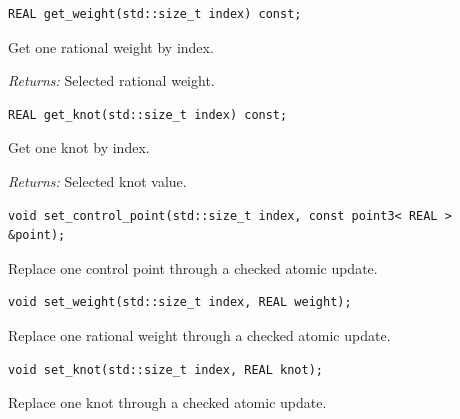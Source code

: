\par\noindent\begin{minipage}{\linewidth}
\begin{lstlisting}[style=apireference]
REAL get_weight(std::size_t index) const;
\end{lstlisting}
{\footnotesize Get one rational weight by index.\par}
{\footnotesize\textit{Returns:} Selected rational weight.\par}
\end{minipage}\par\vspace{1pt}
\par\noindent\begin{minipage}{\linewidth}
\begin{lstlisting}[style=apireference]
REAL get_knot(std::size_t index) const;
\end{lstlisting}
{\footnotesize Get one knot by index.\par}
{\footnotesize\textit{Returns:} Selected knot value.\par}
\end{minipage}\par\vspace{1pt}
\par\noindent\begin{minipage}{\linewidth}
\begin{lstlisting}[style=apireference]
void set_control_point(std::size_t index, const point3< REAL > &point);
\end{lstlisting}
{\footnotesize Replace one control point through a checked atomic update.\par}
\end{minipage}\par\vspace{1pt}
\par\noindent\begin{minipage}{\linewidth}
\begin{lstlisting}[style=apireference]
void set_weight(std::size_t index, REAL weight);
\end{lstlisting}
{\footnotesize Replace one rational weight through a checked atomic update.\par}
\end{minipage}\par\vspace{1pt}
\par\noindent\begin{minipage}{\linewidth}
\begin{lstlisting}[style=apireference]
void set_knot(std::size_t index, REAL knot);
\end{lstlisting}
{\footnotesize Replace one knot through a checked atomic update.\par}
\end{minipage}\par\vspace{1pt}
